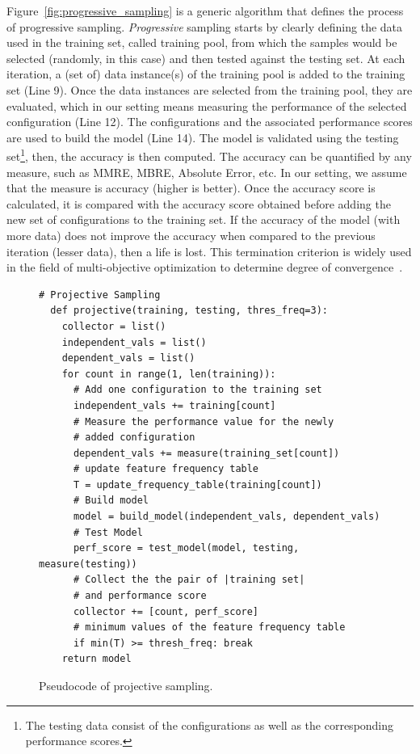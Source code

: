 Figure~\ref{fig:progressive_sampling} is a generic algorithm that defines the process of progressive sampling. \emph{Progressive} sampling starts by clearly defining the data used in the training set, called training pool, from which the samples would be selected (randomly, in this case) and then tested against the testing set. At each iteration, a (set of) data instance(s) of the training pool is added to the training set (Line 9). Once the data instances are selected from the training pool, they are evaluated, which in our setting means measuring the performance of the selected configuration (Line 12). The configurations and the associated performance scores are used to build  the model (Line 14). The model is validated using the testing set\footnote{The testing data consist of the configurations as well as the corresponding performance scores.}, then, the accuracy is then computed. The accuracy can be quantified by any measure, such as MMRE, MBRE, Absolute Error, etc. In our setting, we assume that the measure is accuracy (higher is better). Once the accuracy score is calculated, it is compared with the accuracy score obtained before adding the new set of configurations to the training set. If the accuracy of the model (with more data) does not improve the accuracy when compared to the previous iteration (lesser data), then a life is lost. This termination criterion is widely used in the field of multi-objective optimization to determine degree of convergence~\cite{krall2015gale}.



\begin{figure}[!t]
\small
\hspace{0.4cm}\begin{lstlisting}[xrightmargin=5.0ex, mathescape,frame=none,numbers=right]
  # Projective Sampling
  def projective(training, testing, thres_freq=3): 
    collector = list()
    independent_vals = list()
    dependent_vals = list()
    for count in range(1, len(training)):    
      # Add one configuration to the training set
      independent_vals += training[count]      
      # Measure the performance value for the newly
      # added configuration 
      dependent_vals += measure(training_set[count])  
      # update feature frequency table 
      T = update_frequency_table(training[count])
      # Build model
      model = build_model(independent_vals, dependent_vals)     
      # Test Model
      perf_score = test_model(model, testing, measure(testing))
      # Collect the the pair of |training set| 
      # and performance score
      collector += [count, perf_score]
      # minimum values of the feature frequency table
      if min(T) >= thresh_freq: break
    return model
\end{lstlisting}
\caption{\small{Pseudocode of projective sampling.}
}
\label{fig:projective_sampling} 
\end{figure}

